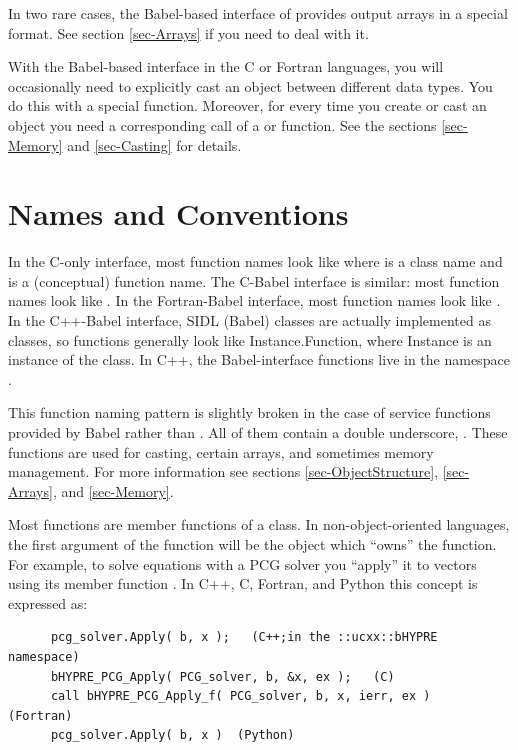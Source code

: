In two rare cases, the Babel-based interface of \hypre{} provides
output arrays in a special format.  See section \ref{sec-Arrays}
if you need to deal with it.

With the Babel-based interface in the C or Fortran languages, you will
occasionally need to explicitly cast an object between different data
types.  You do this with a special  function.  Moreover,
for every time you create or cast an object you need a corresponding
call of a  or  function. See the
sections \ref{sec-Memory} and \ref{sec-Casting} for details.


\section{Names and Conventions}
\label{sec-Names-Conventions}

In the C-only interface, most \hypre{} function names look like
 where  is a class name and
 is a (conceptual) function name.  The C-Babel
interface is similar: most function names look like
.  In the Fortran-Babel interface, most
function names look like .  In the
C++-Babel interface, SIDL (Babel) classes are actually implemented as
classes, so functions generally look like Instance.Function, where
Instance is an instance of the class.  In C++, the
Babel-interface functions live in the namespace .

This function naming pattern is slightly broken in the case of service
functions provided by Babel rather than \hypre{}.  All of them contain
a double underscore, \code{__}.  These functions are used for casting,
certain arrays, and sometimes memory management.  For more information
see sections \ref{sec-ObjectStructure}, \ref{sec-Arrays}, and
\ref{sec-Memory}.

Most functions are member functions of a class.  In
non-object-oriented languages, the first argument of the function will
be the object which ``owns'' the function.  For example, to solve
equations with a PCG solver you ``apply'' it to vectors using its
member function .  In C++, C, Fortran, and Python this
concept is expressed as:
\begin{verbatim}
      pcg_solver.Apply( b, x );   (C++;in the ::ucxx::bHYPRE namespace)
      bHYPRE_PCG_Apply( PCG_solver, b, &x, ex );   (C)
      call bHYPRE_PCG_Apply_f( PCG_solver, b, x, ierr, ex )   (Fortran)
      pcg_solver.Apply( b, x )  (Python)
\end{verbatim}

